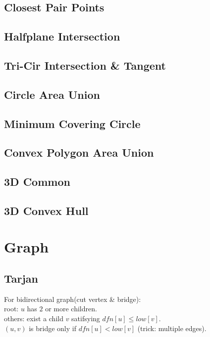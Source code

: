 \documentclass[10pt]{article}
\begin{document}
{\subsection{Closest Pair Points}

\subsection{Halfplane Intersection}


\subsection{Tri-Cir Intersection \& Tangent}



\subsection{Circle Area Union}

\subsection{Minimum Covering Circle}

\subsection{Convex Polygon Area Union}

\subsection{3D Common}

\subsection{3D Convex Hull}

\section{Graph}
\subsection{Tarjan}

For bidirectional graph(cut vertex \& bridge): \\
root: $u$ has $2$ or more children. \\
others: exist a child $v$ satifsying $dfn[u] \le low[v]$. \\
$(u, v)$ is bridge only if $dfn[u] < low[v]$ (trick: multiple edges).\\
}
\end{document}
